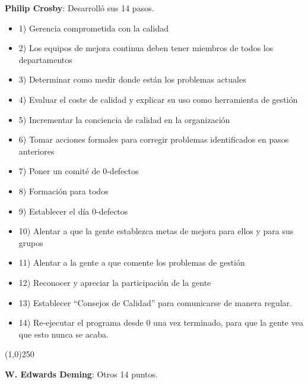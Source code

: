 \documentclass[]{article}
\begin{document}
\textbf{Philip Crosby}: Desarrolló sus 14 pasos. 
\begin{itemize} \item 1) Gerencia comprometida con la calidad \item 2) Los equipos de mejora continua deben tener miembros de todos los departamentos \item 3) Determinar como medir donde están los problemas actuales \item 4) Evaluar el coste de calidad y explicar su uso como herramienta de gestión \item 5) Incrementar la conciencia de calidad en la organización \item 6) Tomar acciones formales para corregir problemas identificados en pasos anteriores \item 7) Poner un comité de 0-defectos \item 8) Formación para todos \item 9) Establecer el día 0-defectos \item 10) Alentar a que la gente establezca metas de mejora para ellos y para sus grupos \item 11) Alentar a la gente a que comente los problemas de gestión \item 12) Reconocer y apreciar la participación de la gente \item 13) Establecer ``Consejos de Calidad'' para comunicarse de manera regular. \item 14) Re-ejecutar el programa desde 0 una vez terminado, para que la gente vea que esto nunca se acaba. 
	\end{itemize}
\begin{center}
	\line(1,0){250}
\end{center}
\textbf{W. Edwards Deming}: Otros 14 puntos. 
\end{document}
